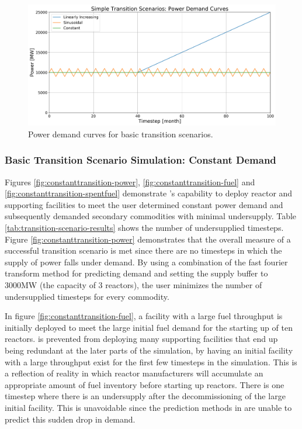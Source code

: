     \begin{figure}[]
        \begin{center}
            \includegraphics[scale=0.37]{./figures/powerplots.png}
        \end{center}
            \caption{Power demand curves for basic transition scenarios.}
        \label{fig:powerplots}
    \end{figure}

\subsubsection{\textbf{Basic Transition Scenario Simulation: Constant Demand}}
Figures \ref{fig:constanttransition-power}, \ref{fig:constanttransition-fuel}
and \ref{fig:constanttransition-spentfuel} demonstrate \deploy's capability 
to deploy reactor and supporting facilities to meet the user 
determined constant power demand and subsequently demanded 
secondary commodities with minimal undersupply. 
Table \ref{tab:transition-scenario-results} shows the number of 
undersupplied timesteps. 
Figure \ref{fig:constanttransition-power} demonstrates that
the overall measure of a successful transition scenario is 
met since there are no timesteps
in which the supply of power falls under demand.
By using a combination of the fast fourier transform method for 
predicting demand and setting the supply buffer to 3000MW 
(the capacity of 3 reactors), the user minimizes the number of 
undersupplied timesteps for every commodity.

In figure \ref{fig:constanttransition-fuel},
a facility with a large fuel throughput is initially
deployed to meet the large initial fuel demand for the starting
up of ten reactors. 
\deploy is prevented from deploying many supporting
facilities that end up being redundant at the later parts of 
the simulation, by having an initial facility with a large throughput
exist for the first few timesteps in the simulation.
This is a reflection of reality in which reactor manufacturers will 
accumulate an appropriate amount of fuel inventory before starting 
up reactors. 
There is one timestep where there is an undersupply after the 
decommissioning of the large initial facility.  
This is unavoidable since the prediction methods in \deploy are 
unable to predict this sudden drop in demand. 

